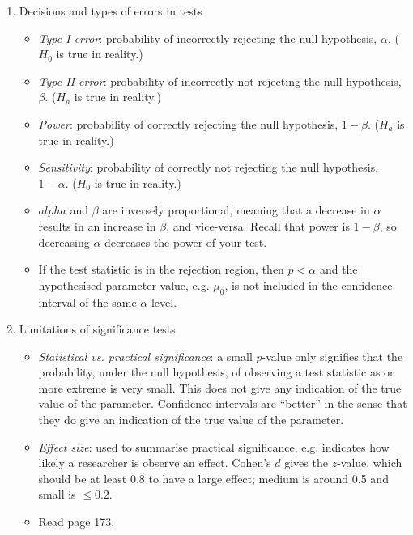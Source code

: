 \begin{enumerate}[label=\textbf{\S~\arabic*}, ref=\S~\arabic*]
\begin{enumerate}
        \item Decisions and types of errors in tests
        \begin{itemize}
            \item \textit{Type I error}: probability of incorrectly rejecting the null hypothesis, $\alpha$. ($H_0$ is true in reality.)
            \item \textit{Type II error}: probability of incorrectly not rejecting the null hypothesis, $\beta$. ($H_a$ is true in reality.)
            \item \textit{Power}: probability of correctly rejecting the null hypothesis, $1-\beta$. ($H_a$ is true in reality.)
            \item \textit{Sensitivity}: probability of correctly not rejecting the null hypothesis, $1-\alpha$. ($H_0$ is true in reality.)
            \item $alpha$ and $\beta$ are inversely proportional, meaning that a decrease in $\alpha$ results in an increase in $\beta$, and vice-versa. Recall that power is $1 - \beta$, so decreasing $\alpha$ decreases the power of your test. 
            \item If the test statistic is in the rejection region, then $p<\alpha$ and the hypothesised parameter value, e.g. $\mu_0$, is not included in the confidence interval of the same $\alpha$ level.
        \end{itemize}
        
        \item Limitations of significance tests
        \begin{itemize}
            \item \textit{Statistical vs. practical significance}: a small $p$-value only signifies that the probability, under the null hypothesis, of observing a test statistic as or more extreme is very small. This does not give any indication of the true value of the parameter. Confidence intervals are ``better'' in the sense that they do give an indication of the true value of the parameter.
            \item \textit{Effect size}: used to summarise practical significance, e.g. indicates how likely a researcher is observe an effect. Cohen's $d$ gives the $z$-value, which should be at least 0.8 to have a large effect; medium is around 0.5 and small is $\leq 0.2$.
            \item Read page 173.
        \end{itemize}
        

\end{enumerate}
\end{enumerate}
